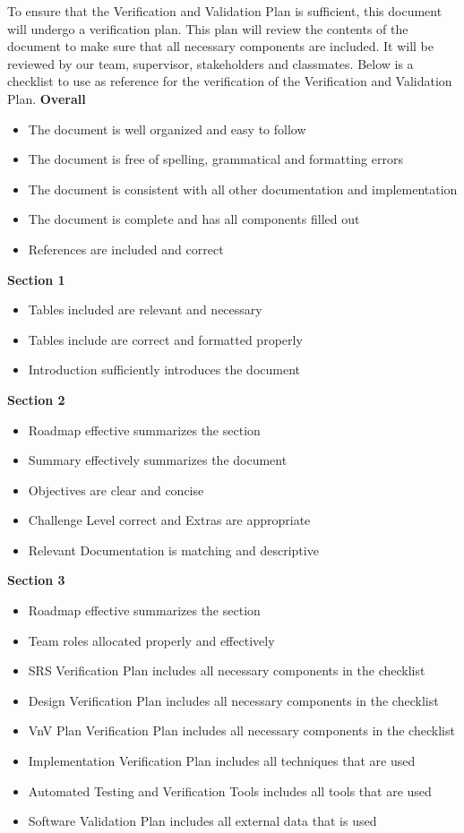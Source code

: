 \documentclass[12pt, titlepage]{article}
\begin{document}
To ensure that the Verification and Validation Plan is sufficient, this document will undergo a verification plan.
This plan will review the contents of the document to make sure that all necessary components are included.
It will be reviewed by our team, supervisor, stakeholders and classmates.
Below is a checklist to use as reference for the verification of the Verification and Validation Plan.
\bigskip
\newline
\textbf{Overall}
\begin{itemize}
  \item The document is well organized and easy to follow
  \item The document is free of spelling, grammatical and formatting errors
  \item The document is consistent with all other documentation and implementation
  \item The document is complete and has all components filled out
  \item References are included and correct
\end{itemize}
\noindent
\textbf{Section 1}
\begin{itemize}
  \item Tables included are relevant and necessary
  \item Tables include are correct and formatted properly
  \item Introduction sufficiently introduces the document
\end{itemize}
\noindent
\textbf{Section 2}
\begin{itemize}
  \item Roadmap effective summarizes the section
  \item Summary effectively summarizes the document
  \item Objectives are clear and concise
  \item Challenge Level correct and Extras are appropriate
  \item Relevant Documentation is matching and descriptive
\end{itemize}
\noindent
\textbf{Section 3}
\begin{itemize}
  \item Roadmap effective summarizes the section
  \item Team roles allocated properly and effectively
  \item SRS Verification Plan includes all necessary components in the checklist
  \item Design Verification Plan includes all necessary components in the checklist
  \item VnV Plan Verification Plan includes all necessary components in the checklist
  \item Implementation Verification Plan includes all techniques that are used
  \item Automated Testing and Verification Tools includes all tools that are used
  \item Software Validation Plan includes all external data that is used
\end{itemize}
\end{document}
